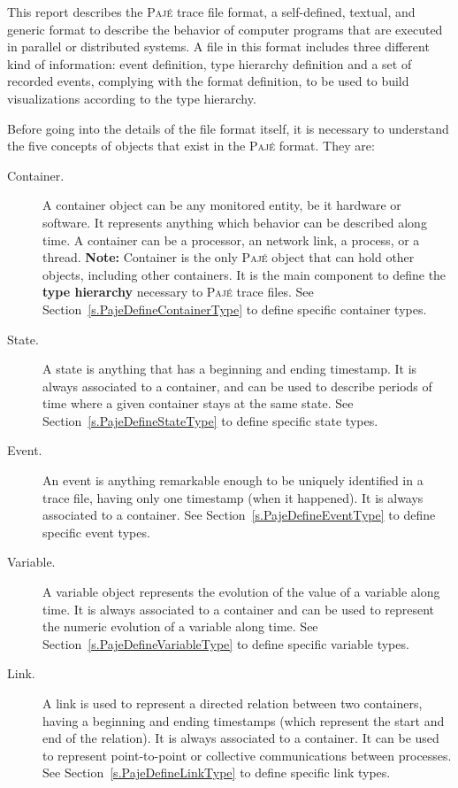 \documentclass[12pt]{article}
\newcommand{\Paje}{\textsc{Paj\'e}\xspace}
\begin{document}
This report describes the \Paje trace file format, a self-defined,
textual, and generic format to describe the behavior of computer
programs that are executed in parallel or distributed systems. A file
in this format includes three different kind of information: event
definition, type hierarchy definition and a set of recorded events,
complying with the format definition, to be used to build
visualizations according to the type hierarchy.

Before going into the details of the file format itself, it is
necessary to understand the five concepts of objects that exist in the
\Paje format. They are:

\begin{description}
\item [Container.] A container object can be any monitored entity, be
  it hardware or software. It represents anything which behavior can
  be described along time. A container can be a processor, an network
  link, a process, or a thread. {\bf Note:} Container is the only
  \Paje object that can hold other objects, including other
  containers. It is the main component to define the {\bf type
    hierarchy} necessary to \Paje trace files.  See
  Section~\ref{s.PajeDefineContainerType} to define specific container
  types.

\item [State.] A state is anything that has a beginning and ending
  timestamp. It is always associated to a container, and can be used
  to describe periods of time where a given container stays at the
  same state.  See Section~\ref{s.PajeDefineStateType} to define
  specific state types.

\item [Event.] An event is anything remarkable enough to be uniquely
  identified in a trace file, having only one timestamp (when it
  happened). It is always associated to a container.  See
  Section~\ref{s.PajeDefineEventType} to define specific event types.

\item [Variable.] A variable object represents the evolution of the
  value of a variable along time. It is always associated to a
  container and can be used to represent the numeric evolution of a
  variable along time. See Section~\ref{s.PajeDefineVariableType} to
  define specific variable types.

\item [Link.] A link is used to represent a directed relation between
  two containers, having a beginning and ending timestamps (which
  represent the start and end of the relation). It is always
  associated to a container. It can be used to represent
  point-to-point or collective communications between processes.  See
  Section~\ref{s.PajeDefineLinkType} to define specific link types.
\end{description}
\end{document}
